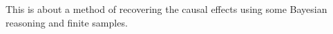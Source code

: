 This is about a method of recovering the causal effects using some Bayesian reasoning and finite samples.
